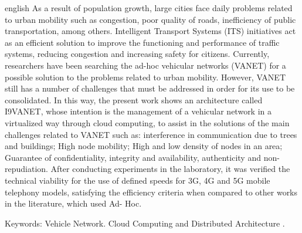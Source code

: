 \documentclass[
	12pt,				%
	oneside,			%
	a4paper,			%
	english,			%
	brazil				%
	]{abntex2ppgsi}
\begin{document}
\begin{resumo}[Abstract]
\begin{otherlanguage*}{english}
As a result of population growth, large cities face daily problems related to urban mobility such as congestion, poor quality of roads, inefficiency of public transportation, among others. Intelligent Transport Systems (ITS) initiatives act as an efficient solution to improve the functioning and performance of traffic systems, reducing congestion and increasing safety for citizens. Currently, researchers have been searching the ad-hoc vehicular networks (VANET) for a possible solution to the problems related to urban mobility. However, VANET still has a number of challenges that must be addressed in order for its use to be consolidated. In this way, the present work shows an architecture called I9VANET, whose intention is the management of a vehicular network in a virtualized way through cloud computing, to assist in the solutions of the main challenges related to VANET such as: interference in communication due to trees and buildings; High node mobility; High and low density of nodes in an area; Guarantee of confidentiality, integrity and availability, authenticity and non-repudiation. After conducting experiments in the laboratory, it was verified the technical viability for the use of defined speeds for 3G, 4G and 5G mobile telephony models, satisfying the efficiency criteria when compared to other works in the literature, which used Ad- Hoc.

Keywords: Vehicle Network. Cloud Computing and Distributed Architecture .
\end{otherlanguage*}
\end{resumo}

\listoffigures*
\cleardoublepage


\listoftables*
\cleardoublepage
\end{document}

